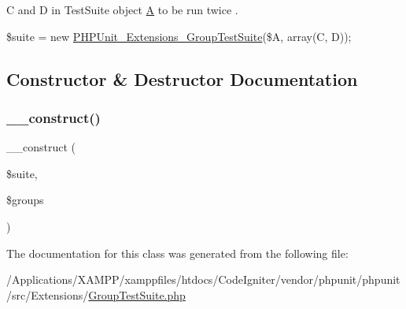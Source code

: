 C and  D in Test\+Suite object \mbox{\hyperlink{class_a}{A}} to be run twice .

{\ttfamily  \$suite = new \mbox{\hyperlink{class_p_h_p_unit___extensions___group_test_suite}{P\+H\+P\+Unit\+\_\+\+Extensions\+\_\+\+Group\+Test\+Suite}}(\$A, array(\textquotesingle{}C\textquotesingle{}, \textquotesingle{}D\textquotesingle{})); } 

\subsection{Constructor \& Destructor Documentation}
\mbox{\label{class_p_h_p_unit___extensions___group_test_suite_a3f79867721bf8751410dab810ee6f7ec}} 
\subsubsection{\texorpdfstring{\+\_\+\+\_\+construct()}{\_\_construct()}}
{\footnotesize\ttfamily \+\_\+\+\_\+construct (\begin{DoxyParamCaption}\item[{\mbox{\hyperlink{class_p_h_p_unit___framework___test_suite}{P\+H\+P\+Unit\+\_\+\+Framework\+\_\+\+Test\+Suite}}}]{\$suite,  }\item[{array}]{\$groups }\end{DoxyParamCaption})}



The documentation for this class was generated from the following file\+:\begin{DoxyCompactItemize}
\item 
/\+Applications/\+X\+A\+M\+P\+P/xamppfiles/htdocs/\+Code\+Igniter/vendor/phpunit/phpunit/src/\+Extensions/\mbox{\hyperlink{_group_test_suite_8php}{Group\+Test\+Suite.\+php}}\end{DoxyCompactItemize}
